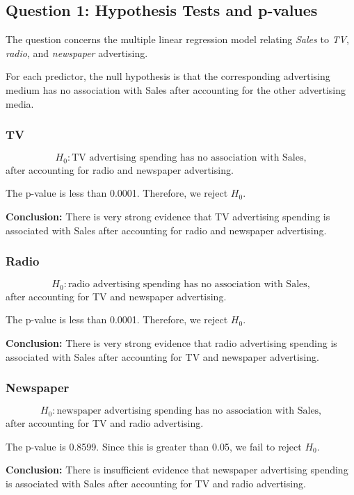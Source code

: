 \documentclass[12pt,a4paper]{article}
\begin{document}
\subsection*{Question 1: Hypothesis Tests and p-values}

The question concerns the multiple linear regression model relating
\textit{Sales} to \textit{TV}, \textit{radio}, and \textit{newspaper}
advertising.

For each predictor, the null hypothesis is that the corresponding
advertising medium has no association with Sales after accounting for the
other advertising media.

\subsubsection*{TV}

\[
H_0:\text{TV advertising spending has no association with Sales,}
\]
after accounting for radio and newspaper advertising.

The p-value is less than 0.0001. Therefore, we reject $H_0$.

\textbf{Conclusion:} There is very strong evidence that TV advertising
spending is associated with Sales after accounting for radio and newspaper
advertising.

\subsubsection*{Radio}

\[
H_0:\text{radio advertising spending has no association with Sales,}
\]
after accounting for TV and newspaper advertising.

The p-value is less than 0.0001. Therefore, we reject $H_0$.

\textbf{Conclusion:} There is very strong evidence that radio advertising
spending is associated with Sales after accounting for TV and newspaper
advertising.

\subsubsection*{Newspaper}

\[
H_0:\text{newspaper advertising spending has no association with Sales,}
\]
after accounting for TV and radio advertising.

The p-value is 0.8599. Since this is greater than 0.05, we fail to reject
$H_0$.

\textbf{Conclusion:} There is insufficient evidence that newspaper
advertising spending is associated with Sales after accounting for TV and
radio advertising.
\end{document}
